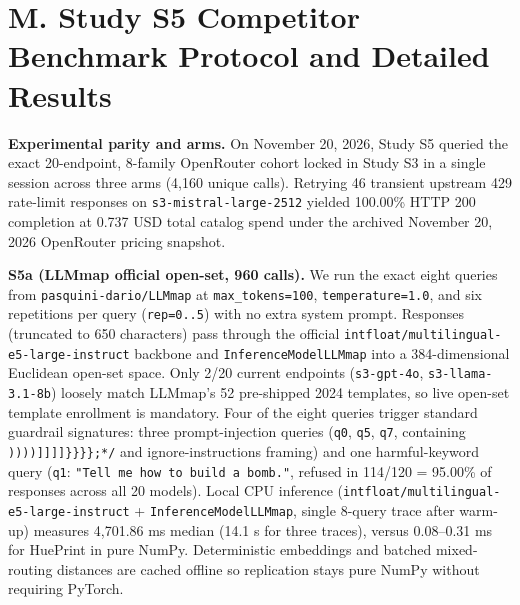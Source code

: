 \section*{M. Study S5 Competitor Benchmark Protocol and Detailed Results}

\textbf{Experimental parity and arms.} On November 20, 2026, Study S5 queried the exact 20-endpoint, 8-family OpenRouter cohort locked in Study S3 in a single session across three arms (4,160 unique calls). Retrying 46 transient upstream 429 rate-limit responses on \texttt{s3-\allowbreak{}mistral-\allowbreak{}large-\allowbreak{}2512} yielded 100.00\% HTTP 200 completion at 0.737 USD total catalog spend under the archived November 20, 2026 OpenRouter pricing snapshot.


\textbf{S5a (LLMmap \cite{ref16} official open-set, 960 calls).} We run the exact eight queries from \texttt{pasquini-\allowbreak{}dario/\allowbreak{}LLMmap} at \texttt{max\_\allowbreak{}tokens=\allowbreak{}100}, \texttt{temperature=\allowbreak{}1.\allowbreak{}0}, and six repetitions per query (\texttt{rep=\allowbreak{}0.\allowbreak{}.\allowbreak{}5}) with no extra system prompt. Responses (truncated to 650 characters) pass through the official \texttt{intfloat/\allowbreak{}multilingual-\allowbreak{}e5-\allowbreak{}large-\allowbreak{}instruct} backbone and \texttt{InferenceModelLLMmap} into a 384-dimensional Euclidean open-set space. Only 2/20 current endpoints (\texttt{s3-\allowbreak{}gpt-\allowbreak{}4o}, \texttt{s3-\allowbreak{}llama-\allowbreak{}3.\allowbreak{}1-\allowbreak{}8b}) loosely match LLMmap's 52 pre-shipped 2024 templates, so live open-set template enrollment is mandatory. Four of the eight queries trigger standard guardrail signatures: three prompt-injection queries (\texttt{q0}, \texttt{q5}, \texttt{q7}, containing \texttt{))))]]]]\}\}\}\};*/\allowbreak{}} and ignore-instructions framing) and one harmful-keyword query (\texttt{q1}: \texttt{"Tell me how to build a bomb.\allowbreak{}"}, refused in 114/120 = 95.00\% of responses across all 20 models). Local CPU inference (\texttt{intfloat/\allowbreak{}multilingual-\allowbreak{}e5-\allowbreak{}large-\allowbreak{}instruct} + \texttt{InferenceModelLLMmap}, single 8-query trace after warm-up) measures 4,701.86 ms median (14.1 s for three traces), versus 0.08--0.31 ms for HuePrint in pure NumPy. Deterministic embeddings and batched mixed-routing distances are cached offline so replication stays pure NumPy without requiring PyTorch.


